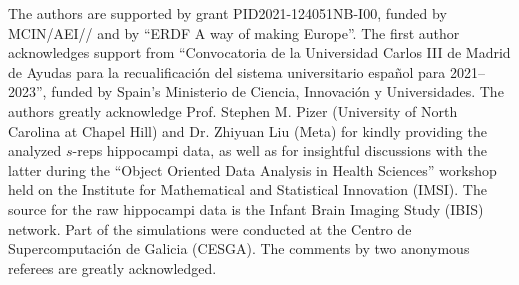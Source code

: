 \documentclass[oneside,11pt]{article}
\begin{document}
The authors are supported by grant PID2021-124051NB-I00, funded by MCIN/\-AEI// and by ``ERDF A way of making Europe''. The first author acknowledges support from ``Convocatoria de la Universidad Carlos III de Madrid de Ayudas para la recualificación del sistema universitario español para 2021--2023'', funded by Spain's Ministerio de Ciencia, Innovación y Universidades. The authors greatly acknowledge Prof. Stephen M. Pizer (University of North Carolina at Chapel Hill) and Dr. Zhiyuan Liu (Meta) for kindly providing the analyzed $s$-reps hippocampi data, as well as for insightful discussions with the latter during the ``Object Oriented Data Analysis in Health Sciences'' workshop held on the Institute for Mathematical and Statistical Innovation (IMSI). The source for the raw hippocampi data is the Infant Brain Imaging Study (IBIS) network. Part of the simulations were conducted at the Centro de Supercomputación de Galicia (CESGA). The comments by two anonymous referees are greatly acknowledged.

%
%
\end{document}

